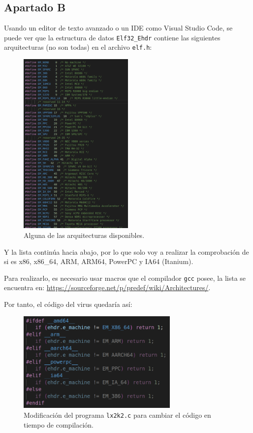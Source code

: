 \documentclass{article}
\begin{document}
\subsection*{Apartado B}

Usando un editor de texto avanzado o un IDE como Visual Studio Code, se puede ver que la estructura de datos \verb|Elf32_Ehdr| contiene las siguientes arquitecturas (no son todas) en el archivo \verb|elf.h|:

\begin{figure}[H]
    \centering
    \includegraphics[width=0.5\textwidth]{imagenes/Captura desde 2022-11-23 13-07-09.png}
    \caption{Alguna de las arquitecturas disponibles.}
\end{figure}

Y la lista continúa hacia abajo, por lo que solo voy a realizar la comprobación de si es x86, x86\_64, ARM, ARM64, PowerPC y IA64 (Itanium). 

\newpage

Para realizarlo, es necesario usar macros que el compilador \verb|gcc| posee, la lista se encuentra en: \url{https://sourceforge.net/p/predef/wiki/Architectures/}.

\bigskip

Por tanto, el código del virus quedaría así:

\begin{figure}[H]
    \centering
    \includegraphics[width=0.7\textwidth]{imagenes/Captura desde 2022-11-25 17-21-11.png}
    \caption{Modificación del programa \texttt{lx2k2.c} para cambiar el código en tiempo de compilación.}
\end{figure}
\end{document}
